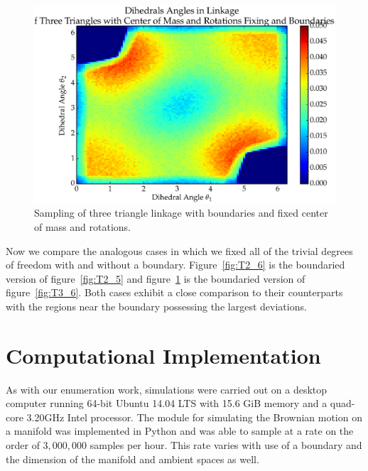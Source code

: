 \begin{figure}[ht]
\centering
  \includegraphics[scale=0.55]{images/T3_7_2D.eps}
\caption{Sampling of three triangle linkage with boundaries and fixed center of mass and rotations.}
\label{fig:T3_7}
\end{figure}


Now we compare the analogous cases in which we fixed all of the trivial degrees of freedom with and without a boundary. Figure~\ref{fig:T2_6} is the boundaried version of figure~\ref{fig:T2_5} and figure~\ref{fig:T3_7} is the boundaried version of figure~\ref{fig:T3_6}. Both cases exhibit a close comparison to their counterparts with the regions near the boundary possessing the largest deviations. 

\section{Computational Implementation}

As with our enumeration work, simulations were carried out on a desktop computer running 64-bit Ubuntu 14.04 LTS with 15.6 GiB memory and a quad-core 3.20GHz Intel processor. The module for simulating the Brownian motion on a manifold was implemented in Python and was able to sample at a rate on the order of $3,000,000$ samples per hour. This rate varies with use of a boundary and the dimension of the manifold and ambient spaces as well. 
